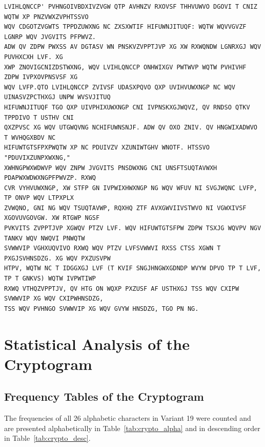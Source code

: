 \documentclass[12pt,a4paper]{article}
\begin{document}
\begin{lstlisting}[caption={Intercepted Ciphertext (Variant 19)}]
LVIHLQNCCP' PVHNGOIVBDXIVZVGW QTP AVHNZV RXOVSF THHVUWVO DGOVI T CNIZ WQTW XP PNZVWXZVPHTSSVO 
WQV CDGOTZVGWTS TPPDZUWXNG NC ZXSXWTIF HIFUWNJITUQF: WQTW WQVVGVZF LGNRP WQV JVGVITS PFPWVZ. 
ADW QV ZDPW PWXSS AV DGTASV WN PNSKVZVPPTJVP XG XW RXWQNDW LGNRXGJ WQV PUVHXCXH LVF. XG 
XWP ZNOVIGCNIZDSTWXNG, WQV LVIHLQNCCP ONHWIXGV PWTWVP WQTW PVHIVHF ZDPW IVPXOVPNSVSF XG 
WQV LVFP.QTO LVIHLQNCCP ZVIVSF UDASXPQVO QXP UVIHVUWXNGP NC WQV UINASVZPCTHXGJ UNPW WVSVJITUQ 
HIFUWNJITUQF TGO QXP UIVPHIXUWXNGP CNI IVPNSKXGJWQVZ, QV RNDSO QTKV TPPDIVO T USTHV CNI 
QXZPVSC XG WQV UTGWQVNG NCHIFUWNSNJF. ADW QV OXO ZNIV. QV HNGWIXADWVO T WVHQGXBDV NC 
HIFUWTGTSFPXPWQTW XP NC PDUIVZV XZUNIWTGHV WNOTF. HTSSVO "PDUVIXZUNPXWXNG," 
XWHNGPWXWDWVP WQV ZNPW JVGVITS PNSDWXNG CNI UNSFTSUQTAVWXH PDAPWXWDWXNGPFPWVZP. RXWQ 
CVR VYHVUWXNGP, XW STFP GN IVPWIXHWXNGP NG WQV WFUV NI SVGJWQNC LVFP, TP ONVP WQV LTPXPLX 
ZVWQNO, GNI NG WQV TSUQTAVWP, RQXHQ ZTF AVXGWVIIVSTWVO NI VGWXIVSF XGOVUVGOVGW. XW RTGWP NGSF 
PVKVITS ZVPPTJVP XGWQV PTZV LVF. WQV HIFUWTGTSFPW ZDPW TSXJG WQVPV NGV TANKV WQV NWQVI PNWQTW 
SVWWVIP VGHXUQVIVO RXWQ WQV PTZV LVFSVWWVI RXSS CTSS XGWN T PXGJSVHNSDZG. XG WQV PXZUSVPW 
HTPV, WQTW NC T IDGGXGJ LVF (T KVIF SNGJHNGWXGDNDP WVYW DPVO TP T LVF, TP T GNKVS) WQTW IVPWTIWP 
RXWQ VTHQZVPPTJV, QV HTG ON WQXP PXZUSF AF USTHXGJ TSS WQV CXIPW SVWWVIP XG WQV CXIPWHNSDZG, 
TSS WQV PVHNGO SVWWVIP XG WQV GVYW HNSDZG, TGO PN NG.
\end{lstlisting}

\section{Statistical Analysis of the Cryptogram}

\subsection{Frequency Tables of the Cryptogram}
The frequencies of all 26 alphabetic characters in Variant 19 were counted and are presented alphabetically in Table~\ref{tab:crypto_alpha} and in descending order in Table~\ref{tab:crypto_desc}.
\end{document}
